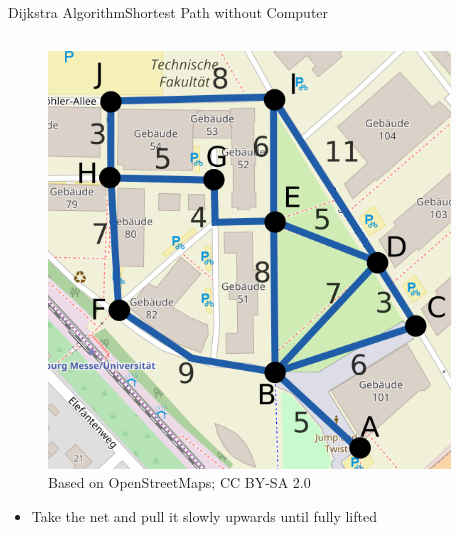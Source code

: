 \begin{frame}{Dijkstra Algorithm}{Shortest Path without Computer}
  \vspace{-1.5em}
  \begin{columns}
    \begin{column}{0.5\linewidth}
      \begin{figure}[!t]
        \includegraphics[width=0.6\linewidth]
          {Images/Dijkstra/DijkstraMapTF.png}
          \caption{Based on OpenStreetMaps; CC BY-SA 2.0}
      \end{figure}
      \vspace{-1.5em}
      \begin{itemize}
        \item
          Take the net and pull it slowly upwards until fully lifted
      \end{itemize}
    \end{column}
    \begin{column}{0.5\linewidth}
%

\end{column}
\end{columns}
\end{frame}

